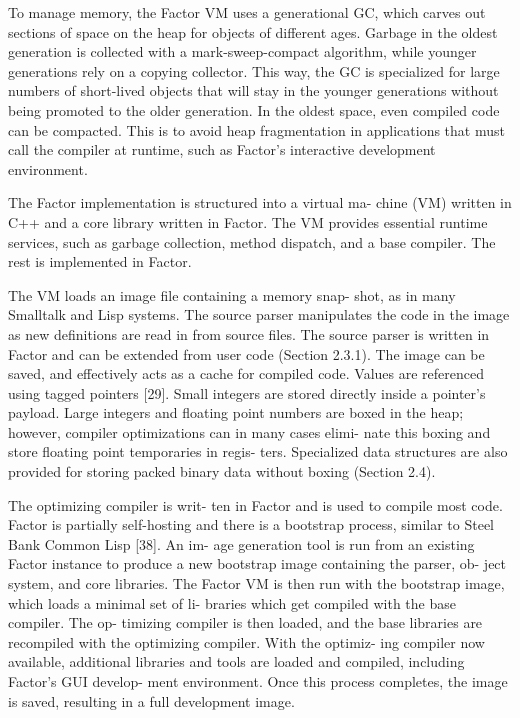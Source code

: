 To manage memory, the Factor \gls{VM} uses a generational \gls{GC}, which
carves out sections of space on the heap for objects of different ages.
Garbage in the oldest generation is collected with a mark-sweep-compact
algorithm, while younger generations rely on a copying collector.
This way, the \gls{GC} is specialized for large numbers of short-lived objects
that will stay in the younger generations without being promoted to the older
generation.  In the oldest space, even compiled code can be compacted.  This is
to avoid heap fragmentation in applications that must call the compiler at
runtime, such as Factor's interactive development environment.


The Factor implementation is structured into a virtual ma- chine (VM) written
in C++ and a core library written in Factor. The VM provides essential runtime
services, such as garbage collection, method dispatch, and a base compiler.
The rest is implemented in Factor.

The VM loads an image ﬁle containing a memory snap- shot, as in many Smalltalk
and Lisp systems. The source parser manipulates the code in the image as new
deﬁnitions are read in from source ﬁles. The source parser is written in Factor
and can be extended from user code (Section 2.3.1).  The image can be saved,
and effectively acts as a cache for compiled code.  Values are referenced using
tagged pointers [29]. Small integers are stored directly inside a pointer’s
payload. Large integers and ﬂoating point numbers are boxed in the heap;
however, compiler optimizations can in many cases elimi- nate this boxing and
store ﬂoating point temporaries in regis- ters. Specialized data structures are
also provided for storing packed binary data without boxing (Section 2.4).

The optimizing compiler is writ- ten in Factor and is
used to compile most code.  Factor is partially self-hosting and there is a
bootstrap process, similar to Steel Bank Common Lisp [38]. An im- age
generation tool is run from an existing Factor instance to produce a new
bootstrap image containing the parser, ob- ject system, and core libraries. The
Factor VM is then run with the bootstrap image, which loads a minimal set of
li- braries which get compiled with the base compiler. The op- timizing
compiler is then loaded, and the base libraries are recompiled with the
optimizing compiler. With the optimiz- ing compiler now available, additional
libraries and tools are loaded and compiled, including Factor’s GUI develop-
ment environment. Once this process completes, the image is saved, resulting in
a full development image.
